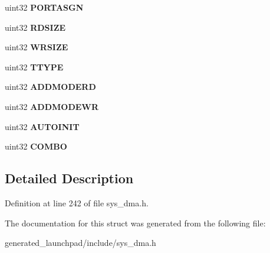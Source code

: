 \begin{DoxyCompactItemize}
uint32 {\bfseries P\+O\+R\+T\+A\+S\+GN}
\item 
\mbox{\label{structdmaCTRLPKT_ab134252c3d1b8b176be7797cb3c29c24}} 
uint32 {\bfseries R\+D\+S\+I\+ZE}
\item 
\mbox{\label{structdmaCTRLPKT_a0410ed7f72f567f8ea6d5cb66bad505d}} 
uint32 {\bfseries W\+R\+S\+I\+ZE}
\item 
\mbox{\label{structdmaCTRLPKT_a2ad3639f9f0acdb4ad95757302a7d11e}} 
uint32 {\bfseries T\+T\+Y\+PE}
\item 
\mbox{\label{structdmaCTRLPKT_a576b2d7cf84b8ee97c04825bb6bae2fb}} 
uint32 {\bfseries A\+D\+D\+M\+O\+D\+E\+RD}
\item 
\mbox{\label{structdmaCTRLPKT_a656ff611f1d7273d527659bce0472476}} 
uint32 {\bfseries A\+D\+D\+M\+O\+D\+E\+WR}
\item 
\mbox{\label{structdmaCTRLPKT_a1cd53a394e13b354ec545a9b22ab90b5}} 
uint32 {\bfseries A\+U\+T\+O\+I\+N\+IT}
\item 
\mbox{\label{structdmaCTRLPKT_afd05adfa55815ae5871c1707efc9dc2e}} 
uint32 {\bfseries C\+O\+M\+BO}
\end{DoxyCompactItemize}


\subsection{Detailed Description}


Definition at line 242 of file sys\+\_\+dma.\+h.



The documentation for this struct was generated from the following file\+:\begin{DoxyCompactItemize}
\item 
generated\+\_\+launchpad/include/sys\+\_\+dma.\+h\end{DoxyCompactItemize}
